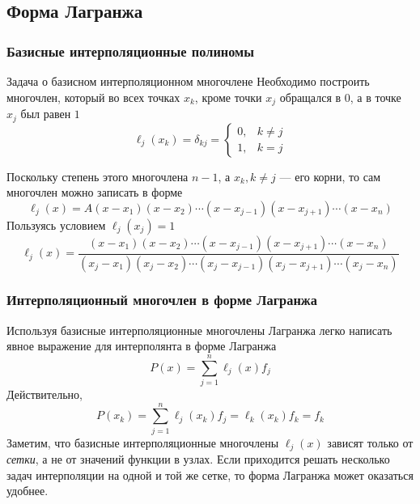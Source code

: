 \documentclass[aspectratio=169,unicode]{beamer}
\begin{document}
\subsection{Форма Лагранжа}
\begin{frame}
\frametitle{Базисные интерполяционные полиномы}
	\begin{block}{Задача о базисном интерполяционном многочлене}
		Необходимо построить многочлен, который во всех точках $x_k$, кроме точки $x_j$ обращался в 0,
		а в точке $x_j$ был равен $1$
		\[
		\ell_j(x_k) = \delta_{kj} =
		\begin{cases}
		0,& k\neq j\\
		1,& k = j
		\end{cases}
		\]
	\end{block}
	\pause
	Поскольку степень этого многочлена $n-1$, а $x_k, k\neq j$ --- его корни,
	то сам многочлен можно записать в форме
	$$
	\ell_j(x) = A(x-x_1)(x-x_2)\cdots(x-x_{j-1})(x-x_{j+1})\cdots(x-x_n)
	$$
	\pause
	Пользуясь условием $\ell_j(x_j) = 1$
	$$
	\ell_j(x) = \frac{(x-x_1)(x-x_2)\cdots(x-x_{j-1})(x-x_{j+1})\cdots(x-x_n)}
		{(x_j-x_1)(x_j-x_2)\cdots(x_j-x_{j-1})(x_j-x_{j+1})\cdots(x_j-x_n)}
	$$
\end{frame}

\begin{frame}
\frametitle{Интерполяционный многочлен в форме Лагранжа}
	Используя базисные интерполяционные многочлены Лагранжа легко написать
	явное выражение для интерполянта в форме Лагранжа
	\[
	P(x) = \sum_{j=1}^n \ell_j(x) f_j
	\]
	\pause
	Действительно,
	\[
	P(x_k) = \sum_{j=1}^n \ell_j(x_k) f_j = \ell_k(x_k) f_k = f_k
	\]
	\pause
	Заметим, что базисные интерполяционные многочлены $\ell_j(x)$ зависят только
	от \emph{сетки}, а не от значений функции в узлах. Если приходится решать
	несколько задач интерполяции на одной и той же сетке, то форма Лагранжа может
	оказаться удобнее.
\end{frame}
\end{document}
